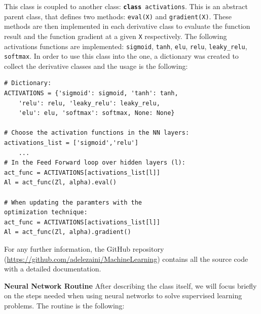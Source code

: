 \documentclass[english,notitlepage,reprint,nofootinbib]{revtex4-1}  %
\begin{document}
This class is coupled to another class: \texttt{\textbf{class} activations}. This is an abstract parent class, that defines two methods: \texttt{eval(X)} and \texttt{gradient(X)}. These methods are then implemented in each derivative class to evaluate the function result and the function gradient at a given \texttt{X} respectively.
The following activations functions are implemented:
\texttt{sigmoid}, \texttt{tanh}, \texttt{elu}, \texttt{relu}, \texttt{leaky\_relu}, \texttt{softmax}. In order to use this class into the  one, a dictionary was created to collect the derivative classes and the usage is the following:

\begin{verbatim}
# Dictionary:
ACTIVATIONS = {'sigmoid': sigmoid, 'tanh': tanh,
    'relu': relu, 'leaky_relu': leaky_relu, 
    'elu': elu, 'softmax': softmax, None: None}
    
# Choose the activation functions in the NN layers:
activations_list = ['sigmoid','relu']
    ...
# In the Feed Forward loop over hidden layers (l):
act_func = ACTIVATIONS[activations_list[l]] 
Al = act_func(Zl, alpha).eval()

# When updating the paramters with the 
optimization technique:
act_func = ACTIVATIONS[activations_list[l]] 
Al = act_func(Zl, alpha).gradient()
\end{verbatim}

For any further information, the GitHub repository (\href{https://github.com/adelezaini/MachineLearning/Projects/Project2}{https://github.com/adelezaini/MachineLearning}) contains all the source code with a detailed documentation.

\textbf{Neural Network Routine} After describing the class itself, we will focus briefly on the steps needed when using neural networks to solve supervised learning problems. The routine is the following:
\end{document}
